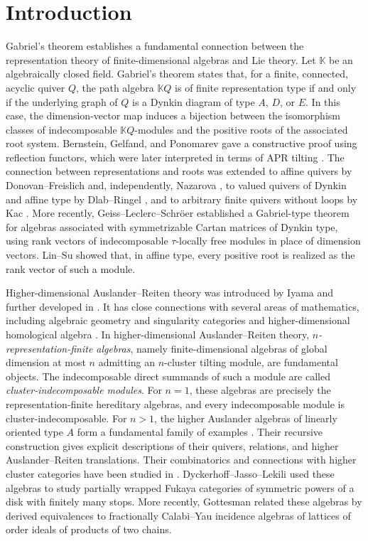 \documentclass[11pt,a4paper]{amsart}
\theoremstyle{definition}
\numberwithin{equation}{section}
\newcommand{\0}{\mathbf{0}}
\begin{document}
	\section{Introduction} Gabriel's theorem \cite{G} establishes a fundamental connection
	between the representation theory of finite-dimensional algebras
	and Lie theory. 
	Let $\mathbb K$ be an algebraically closed field. Gabriel's theorem states that, for a finite, connected, acyclic quiver $Q$, the
	path algebra $\mathbb KQ$ is of finite representation type if and
	only if the underlying graph of $Q$ is a Dynkin diagram of type $A$,
	$D$, or $E$. In this case, the dimension-vector map induces a
	bijection between the isomorphism classes of indecomposable
	$\mathbb KQ$-modules and the positive roots of the associated root
	system. Bernstein, Gelfand, and Ponomarev \cite{BGP} gave a
	constructive proof using reflection functors, which were later
	interpreted in terms of APR tilting \cite{APR}. 
	The connection between representations and roots was extended
	to affine quivers by Donovan--Freislich \cite{DF} and,
	independently, Nazarova \cite{N}, to valued quivers of Dynkin
	and affine type by Dlab--Ringel \cite{DR}, and to arbitrary
	finite quivers without loops by Kac \cite{Ka}.
	More recently, Geiss--Leclerc--Schr\"oer \cite{GLS} established
	a Gabriel-type theorem for algebras associated with
	symmetrizable Cartan matrices of Dynkin type, using rank
	vectors of indecomposable $\tau$-locally free modules
	in place of dimension vectors.
	Lin--Su \cite{LS} showed that, in affine type, every positive
	root is realized as the rank vector of such a module.

	Higher-dimensional Auslander--Reiten theory was introduced by Iyama
	\cite{I1} and further developed in \cite{HI1,HIO,I3,IO1,IO2,Ja}. 
	It has close connections with  several areas of mathematics, including algebraic
	geometry and singularity categories \cite{HIMO,HKV, Kv} and higher-dimensional homological algebra \cite{DKW,GKO,Ja}. 
	In higher-dimensional  Auslander--Reiten theory,  
	\emph{$n$-representation-finite algebras}, namely finite-dimensional
	algebras of global dimension at most $n$ admitting an
	$n$-cluster tilting module, are fundamental objects.
	The indecomposable direct summands of such a module are called
	\emph{cluster-indecomposable modules}.
	For $n=1$, these algebras are precisely the representation-finite
	hereditary algebras, and every indecomposable module is
	cluster-indecomposable. 
	For $n>1$, the higher Auslander algebras of linearly oriented type $A$
	form a fundamental family of examples \cite{I3}. Their recursive construction gives explicit descriptions of their quivers, relations, and higher Auslander--Reiten translations.
	Their combinatorics and connections with higher cluster categories
	have been studied in \cite{HJ,OT,W}. Dyckerhoff--Jasso--Lekili \cite{DJL} used these algebras to  study partially wrapped Fukaya categories of symmetric powers of a disk with finitely many stops. More recently, Gottesman \cite{Gott} related these algebras by derived equivalences to fractionally Calabi--Yau incidence algebras of
	lattices of order ideals of products of two chains. 
\end{document}
